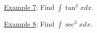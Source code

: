 \documentclass[paper=a4, fontsize=11pt]{scrartcl} %
\numberwithin{equation}{section} %
\numberwithin{figure}{section} %
\numberwithin{table}{section} %
\newcommand{\ds}{\displaystyle}
\begin{document}
\indent

\newpage
\underline{Example 7}: Find $\ds\int \tan^3 x dx$.\\
\indent

\vspace{3in}

\underline{Example 8}: Find $\ds\int \sec^3 x dx$.\\
\indent

\vspace{3in}

\indent

\vspace{3.25in}


\end{document}

